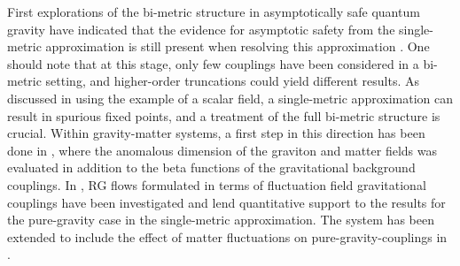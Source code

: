 \documentclass[11pt]{book} %
\numberwithin{equation}{chapter}
\begin{document}
First explorations of the bi-metric structure in asymptotically safe quantum gravity have indicated that the
evidence for asymptotic safety from the single-metric approximation is still present when
resolving this approximation
\cite{
  Manrique:2009uh, Manrique:2010mq, Manrique:2010am, Christiansen:2012rx, Codello:2013fpa,
  Christiansen:2014raa, Becker:2014qya, Christiansen:2015rva}.
One should note that at this stage, only few couplings have been considered in a bi-metric setting,
and higher-order truncations could yield different results.
As discussed in \cite{Bridle:2013sra} using the example of a scalar field,
a single-metric approximation can result in spurious fixed points,
and a treatment of the full bi-metric structure is crucial.
Within gravity-matter systems, a first step in this direction has been done in
\cite{Dona:2013qba, Dona:2014pla}, where the anomalous dimension of the graviton and matter
fields was evaluated in addition to the beta functions of the gravitational background couplings.
In \cite{Christiansen:2014raa, Christiansen:2015rva},
RG flows formulated in terms of fluctuation field gravitational couplings have been
investigated and lend quantitative support to the results for the pure-gravity
case in the single-metric approximation. The system has been extended to include the effect
of matter fluctuations on pure-gravity-couplings in \cite{Meibohm:2015twa}.
\end{document}
